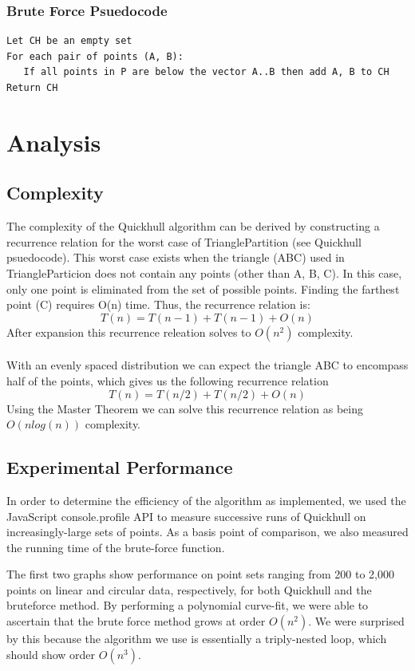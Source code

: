 \documentclass[11pt]{article}
\begin{document}
\subsubsection{Brute Force Psuedocode}
\begin{verbatim}
Let CH be an empty set
For each pair of points (A, B):
   If all points in P are below the vector A..B then add A, B to CH
Return CH
\end{verbatim}

\section{Analysis}

\subsection{Complexity}
The complexity of the Quickhull algorithm can be derived by constructing a recurrence relation for the worst case of TrianglePartition (see Quickhull psuedocode). This worst case exists when the triangle (ABC) used in TriangleParticion does not contain any points (other than A, B, C). In this case, only one point is eliminated from the set of possible points. Finding the farthest point (C) requires O(n) time. Thus, the recurrence relation is:
\[ T(n) = T(n - 1) + T(n - 1) + O(n) \]
After expansion this recurrence releation solves to $O(n^2)$ complexity\cite{Kent:QH}.
\\
\\
With an evenly spaced distribution we can expect the triangle ABC to encompass half of the points, which gives us the following recurrence relation
\[ T(n) = T(n / 2) + T(n / 2) + O(n) \]
Using the Master Theorem we can solve this recurrence relation as being $O(n log(n))$ complexity\cite{Kent:QH}.

\subsection{Experimental Performance}
In order to determine the efficiency of the algorithm as implemented, we used the JavaScript console.profile API to measure successive runs of Quickhull on increasingly-large sets of points. As a basis point of comparison, we also measured the running time of the brute-force function.

The first two graphs show performance on point sets ranging from 200 to 2,000 points on linear and circular data, respectively, for both Quickhull and the bruteforce method. By performing a polynomial curve-fit, we were able to ascertain that the brute force method grows at order $O(n^2)$. We were surprised by this because the algorithm we use is essentially a triply-nested loop, which should show order $O(n^3)$.
\end{document}
